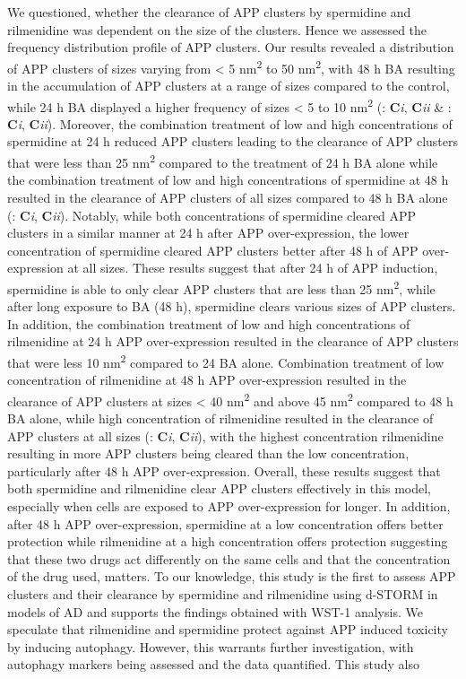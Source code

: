We questioned, whether the clearance of APP clusters by spermidine and rilmenidine was dependent on the size of the clusters. Hence we assessed the frequency distribution profile of APP clusters. Our results revealed a distribution of APP clusters of sizes varying from < 5 nm\textsuperscript{2} to 50 nm\textsuperscript{2}, with 48 h BA resulting in the accumulation of APP clusters at a range of sizes compared to the control, while 24 h BA displayed a higher frequency of sizes < 5 to 10 nm\textsuperscript{2} (: \textbf{C}\textit{i}, \textbf{C}\textit{ii} \& : \textbf{C}\textit{i}, \textbf{C}\textit{ii}). Moreover, the combination treatment of low and high concentrations of spermidine at 24 h reduced APP clusters leading to the clearance of APP clusters that were less than 25 nm\textsuperscript{2} compared to the treatment of 24 h BA alone while the combination treatment of low and high concentrations of spermidine at 48 h resulted in the clearance of APP clusters of all sizes compared to 48 h BA alone (: \textbf{C}\textit{i}, \textbf{C}\textit{ii}). Notably, while both concentrations of spermidine cleared APP clusters in a similar manner at 24 h after APP over-expression, the lower concentration of spermidine cleared APP clusters better after 48 h of APP over-expression at all sizes. These results suggest that after 24 h of APP induction, spermidine is able to only clear APP clusters that are less than 25 nm\textsuperscript{2}, while after long exposure to BA (48 h), spermidine clears various sizes of APP clusters. In addition, the combination treatment of low and high concentrations of rilmenidine at 24 h APP over-expression resulted in the clearance of APP clusters that were less 10 nm\textsuperscript{2} compared to  24 BA alone. Combination treatment of low concentration of rilmenidine at 48 h APP over-expression resulted in the clearance of APP clusters at sizes < 40 nm\textsuperscript{2} and above 45  nm\textsuperscript{2} compared to 48 h BA alone, while high concentration of rilmenidine resulted in the clearance of APP clusters at all sizes (: \textbf{C}\textit{i}, \textbf{C}\textit{ii}), with the highest concentration rilmenidine resulting in more APP clusters being cleared than the low concentration, particularly after 48 h APP over-expression. Overall, these results suggest that both spermidine and rilmenidine clear APP clusters effectively in this model, especially when cells are exposed to APP over-expression for longer. In addition, after 48 h APP over-expression, spermidine at a low concentration offers better protection while rilmenidine at a high concentration offers protection suggesting that these two drugs act differently on the same cells and that the concentration of the drug used, matters. To our knowledge, this study is the first to assess APP clusters and their clearance by spermidine and rilmenidine using d-STORM in models of AD and supports the findings obtained with WST-1 analysis. We speculate that rilmenidine and spermidine protect against APP induced toxicity by inducing autophagy. However, this warrants further investigation, with autophagy markers being assessed and the data quantified. This study also 